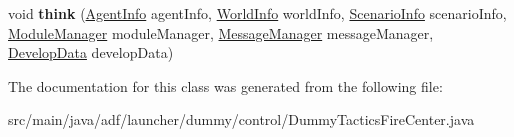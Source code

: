 \begin{DoxyCompactItemize}
\item 
\hypertarget{classadf_1_1launcher_1_1dummy_1_1control_1_1DummyTacticsFireCenter_aa34ce41957683fc6f8b2c1ec17034f16}{}\label{classadf_1_1launcher_1_1dummy_1_1control_1_1DummyTacticsFireCenter_aa34ce41957683fc6f8b2c1ec17034f16} 
void {\bfseries think} (\hyperlink{classadf_1_1agent_1_1info_1_1AgentInfo}{Agent\+Info} agent\+Info, \hyperlink{classadf_1_1agent_1_1info_1_1WorldInfo}{World\+Info} world\+Info, \hyperlink{classadf_1_1agent_1_1info_1_1ScenarioInfo}{Scenario\+Info} scenario\+Info, \hyperlink{classadf_1_1agent_1_1module_1_1ModuleManager}{Module\+Manager} module\+Manager, \hyperlink{classadf_1_1agent_1_1communication_1_1MessageManager}{Message\+Manager} message\+Manager, \hyperlink{classadf_1_1agent_1_1develop_1_1DevelopData}{Develop\+Data} develop\+Data)
\end{DoxyCompactItemize}


The documentation for this class was generated from the following file\+:\begin{DoxyCompactItemize}
\item 
src/main/java/adf/launcher/dummy/control/Dummy\+Tactics\+Fire\+Center.\+java\end{DoxyCompactItemize}
